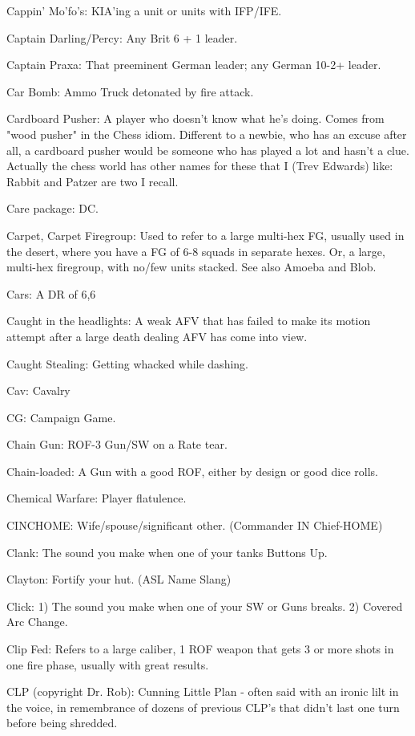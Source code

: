 \documentclass[letterpaper]{article}
\begin{document}
Cappin' Mo'fo's: KIA'ing a unit or units with IFP/IFE.

Captain Darling/Percy: Any Brit 6 + 1 leader.

Captain Praxa: That preeminent German leader; any German 10-2+ leader.

Car Bomb: Ammo Truck detonated by fire attack.

Cardboard Pusher:  A player who doesn't know what he's doing.  Comes from "wood pusher" in the Chess idiom.  Different to a newbie, who has an excuse after all, a cardboard pusher would be someone who has played a lot and hasn't a clue.  Actually the chess world has other names for these that I (Trev Edwards) like:  Rabbit and Patzer are two I recall.

Care package: DC.

Carpet, Carpet Firegroup: Used to refer to a large multi-hex FG, usually used in the desert, where you have a FG of 6-8 squads in separate hexes. Or, a large, multi-hex firegroup, with no/few units stacked. See also Amoeba and Blob.

Cars: A DR of 6,6

Caught in the headlights:  A weak AFV that has failed to make its motion attempt after a large death dealing AFV has come into view.

Caught Stealing: Getting whacked while dashing.

Cav: Cavalry

CG: Campaign Game.

Chain Gun: ROF-3 Gun/SW on a Rate tear.

Chain-loaded: A Gun with a good ROF, either by design or good dice rolls.

Chemical Warfare: Player flatulence.

CINCHOME:  Wife/spouse/significant other. (Commander IN Chief-HOME)

Clank: The sound you make when one of your tanks Buttons Up.

Clayton: Fortify your hut. (ASL Name Slang)

Click: 1) The sound you make when one of your SW or Guns breaks. 2) Covered Arc Change.

Clip Fed: Refers to a large caliber, 1 ROF weapon that gets 3 or more shots in one fire phase, usually with great results.

CLP (copyright Dr. Rob): Cunning Little Plan - often said with an ironic lilt in the voice, in remembrance of dozens of previous CLP's that didn't last one turn before being shredded.
\end{document}
